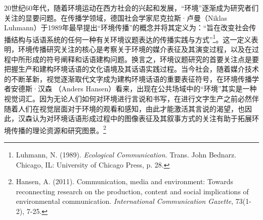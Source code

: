 20世纪60年代，随着环境运动在西方社会的兴起和发展，``环境''逐渐成为研究者们关注的显要问题。在传播学领域，德国社会学家尼克拉斯·卢曼（Niklas
Luhmann）于1989年最早提出``环境传播''的概念并将其定义为：``旨在改变社会传播结构与话语系统的任何一种有关环境议题表达的传播实践与方式''\footnote{Luhmann,
  N. (1989). \emph{Ecological Communication}. Trans. John Bednarz.
  Chicago, IL: University of Chicago Press, p. 28.}。这一定义表明，环境传播研究关注的核心是考察关于环境的媒介表征及其演变过程，以及在过程中所形成的符号阐释和话语建构问题。换言之，环境议题研究的首要关注点是要把握生产和建构环境话语的文化语境及其话语实践过程。当今社会，随着媒介技术的不断革新，视觉逐渐取代文字成为建构环境话语的重要表征符号，在环境传播学者安德斯·汉森
（Anders
Hansen）看来，出现在公共场域中的``环境''其实是一种视觉词汇。因为无论人们如何对环境进行言说和书写，在进行文字生产之前必然伴随着人们在视觉层面对于环境的观看和感知，由此才能激活其言说的渴望，也因此，汉森认为对环境话语形成过程中的图像表征及其叙事方式的关注有助于拓展环境传播的理论资源和研究图景。\footnote{Hansen,
  A. (2011). Communication, media and environment: Towards reconnecting
  research on the production, content and social implications of
  environmental communication. \emph{International Communication
  Gazette}, 73(1-2), 7-25.}

